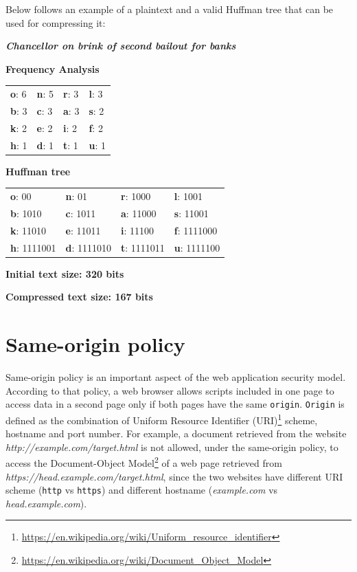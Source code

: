Below follows an example of a plaintext and a valid Huffman tree that can be
used for compressing it:

\bigskip \centerline{\textit{\textbf{Chancellor on brink of second bailout for
banks}}}

\bigskip \centerline{\textbf{Frequency Analysis}}

\begin{table}[H] \centering \begin{tabular}{ | l | l | l | l | } \hline
\textbf{o}: 6 & \textbf{n}: 5 & \textbf{r}: 3 & \textbf{l}: 3 \\ \textbf{b}: 3 &
\textbf{c}: 3 & \textbf{a}: 3 & \textbf{s}: 2 \\ \textbf{k}: 2 & \textbf{e}: 2 &
\textbf{i}: 2 & \textbf{f}: 2 \\ \textbf{h}: 1 & \textbf{d}: 1 & \textbf{t}: 1 &
\textbf{u}: 1 \\ \hline \end{tabular} \end{table}

\centerline{\textbf{Huffman tree}}

\begin{table}[H] \centering \begin{tabular}{ | l | l | l | l | } \hline
\textbf{o}: 00 & \textbf{n}: 01 & \textbf{r}: 1000 & \textbf{l}: 1001 \\
\textbf{b}: 1010 & \textbf{c}: 1011 & \textbf{a}: 11000 & \textbf{s}: 11001 \\
\textbf{k}: 11010 & \textbf{e}: 11011 & \textbf{i}: 11100 & \textbf{f}: 1111000
\\ \textbf{h}: 1111001 & \textbf{d}: 1111010 & \textbf{t}: 1111011 & \textbf{u}:
1111100 \\ \hline \end{tabular} \end{table}

\centerline{\textbf{Initial text size: 320 bits}} \centerline{\textbf{Compressed
text size: 167 bits}}

\section{Same-origin policy}\label{sec:sameorigin}

Same-origin policy is an important aspect of the web application security model.
According to that policy, a web browser allows scripts included in one page to
access data in a second page only if both pages have the same \texttt{origin}.
\texttt{Origin} is defined as the combination of Uniform Resource Identifier
(URI)\footnote{\url{https://en.wikipedia.org/wiki/Uniform_resource_identifier}}
scheme, hostname and port number. For example, a document retrieved from the
website \textit{http://example.com/target.html} is not allowed, under the
same-origin policy, to access the Document-Object
Model\footnote{\url{https://en.wikipedia.org/wiki/Document_Object_Model}} of a
web page retrieved from \textit{https://head.example.com/target.html}, since the
two websites have different URI scheme (\texttt{http} vs \texttt{https}) and
different hostname (\textit{example.com} vs \textit{head.example.com}).

